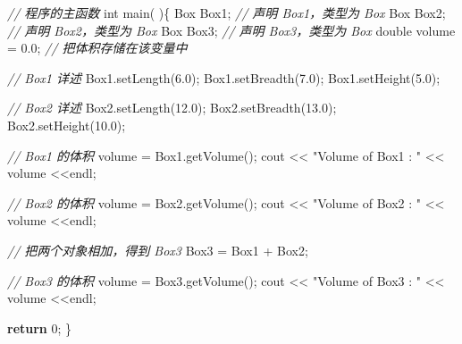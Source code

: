 \documentclass[
]{article}
\newenvironment{Shaded}{}{}
\newcommand{\CommentTok}[1]{\textcolor[rgb]{0.38,0.63,0.69}{\textit{#1}}}
\newcommand{\ControlFlowTok}[1]{\textcolor[rgb]{0.00,0.44,0.13}{\textbf{#1}}}
\newcommand{\DataTypeTok}[1]{\textcolor[rgb]{0.56,0.13,0.00}{#1}}
\newcommand{\DecValTok}[1]{\textcolor[rgb]{0.25,0.63,0.44}{#1}}
\newcommand{\FloatTok}[1]{\textcolor[rgb]{0.25,0.63,0.44}{#1}}
\newcommand{\NormalTok}[1]{#1}
\newcommand{\OperatorTok}[1]{\textcolor[rgb]{0.40,0.40,0.40}{#1}}
\newcommand{\StringTok}[1]{\textcolor[rgb]{0.25,0.44,0.63}{#1}}
\begin{document}
\begin{Shaded}
\begin{Highlighting}[]
\CommentTok{// 程序的主函数}
\DataTypeTok{int}\NormalTok{ main}\OperatorTok{(} \OperatorTok{)\{}
\NormalTok{   Box Box1}\OperatorTok{;}                \CommentTok{// 声明 Box1，类型为 Box}
\NormalTok{   Box Box2}\OperatorTok{;}                \CommentTok{// 声明 Box2，类型为 Box}
\NormalTok{   Box Box3}\OperatorTok{;}                \CommentTok{// 声明 Box3，类型为 Box}
   \DataTypeTok{double}\NormalTok{ volume }\OperatorTok{=} \FloatTok{0.0}\OperatorTok{;}     \CommentTok{// 把体积存储在该变量中}
 
   \CommentTok{// Box1 详述}
\NormalTok{   Box1}\OperatorTok{.}\NormalTok{setLength}\OperatorTok{(}\FloatTok{6.0}\OperatorTok{);} 
\NormalTok{   Box1}\OperatorTok{.}\NormalTok{setBreadth}\OperatorTok{(}\FloatTok{7.0}\OperatorTok{);} 
\NormalTok{   Box1}\OperatorTok{.}\NormalTok{setHeight}\OperatorTok{(}\FloatTok{5.0}\OperatorTok{);}
 
   \CommentTok{// Box2 详述}
\NormalTok{   Box2}\OperatorTok{.}\NormalTok{setLength}\OperatorTok{(}\FloatTok{12.0}\OperatorTok{);} 
\NormalTok{   Box2}\OperatorTok{.}\NormalTok{setBreadth}\OperatorTok{(}\FloatTok{13.0}\OperatorTok{);} 
\NormalTok{   Box2}\OperatorTok{.}\NormalTok{setHeight}\OperatorTok{(}\FloatTok{10.0}\OperatorTok{);}
 
   \CommentTok{// Box1 的体积}
\NormalTok{   volume }\OperatorTok{=}\NormalTok{ Box1}\OperatorTok{.}\NormalTok{getVolume}\OperatorTok{();}
\NormalTok{   cout }\OperatorTok{\textless{}\textless{}} \StringTok{"Volume of Box1 : "} \OperatorTok{\textless{}\textless{}}\NormalTok{ volume }\OperatorTok{\textless{}\textless{}}\NormalTok{endl}\OperatorTok{;}
 
   \CommentTok{// Box2 的体积}
\NormalTok{   volume }\OperatorTok{=}\NormalTok{ Box2}\OperatorTok{.}\NormalTok{getVolume}\OperatorTok{();}
\NormalTok{   cout }\OperatorTok{\textless{}\textless{}} \StringTok{"Volume of Box2 : "} \OperatorTok{\textless{}\textless{}}\NormalTok{ volume }\OperatorTok{\textless{}\textless{}}\NormalTok{endl}\OperatorTok{;}

   \CommentTok{// 把两个对象相加，得到 Box3}
\NormalTok{   Box3 }\OperatorTok{=}\NormalTok{ Box1 }\OperatorTok{+}\NormalTok{ Box2}\OperatorTok{;}

   \CommentTok{// Box3 的体积}
\NormalTok{   volume }\OperatorTok{=}\NormalTok{ Box3}\OperatorTok{.}\NormalTok{getVolume}\OperatorTok{();}
\NormalTok{   cout }\OperatorTok{\textless{}\textless{}} \StringTok{"Volume of Box3 : "} \OperatorTok{\textless{}\textless{}}\NormalTok{ volume }\OperatorTok{\textless{}\textless{}}\NormalTok{endl}\OperatorTok{;}

   \ControlFlowTok{return} \DecValTok{0}\OperatorTok{;}
\OperatorTok{\}}
\end{Highlighting}
\end{Shaded}
\end{document}
